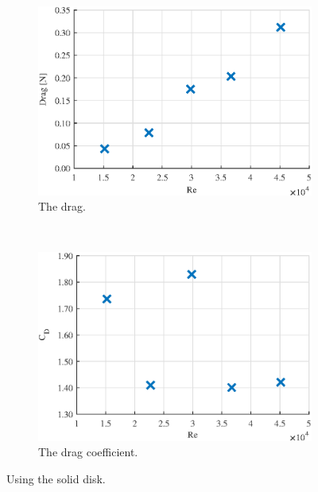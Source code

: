 \begin{figure} 
    \centering
    \begin{subfigure}[b]{0.45\linewidth}
        \includegraphics[width=\textwidth]{0_Images/SolidDragRe.eps}
        \caption{The drag.}
        \label{Fig:SolidDrag}
    \end{subfigure}
    ~
    \begin{subfigure}[b]{0.45\linewidth}
        \includegraphics[width=\textwidth]{0_Images/SolidCDRe.eps}
        \caption{The drag coefficient.}
        \label{Fig:SolidCD}
    \end{subfigure}
    \caption[Drag and drag coefficient of solid disk.]{Using the solid disk.}
    \label{fig:SolidDisk}
\end{figure}


